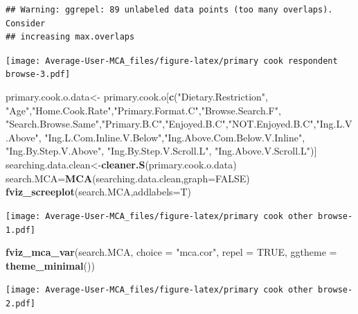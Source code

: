 \documentclass[
]{article}
\newenvironment{Shaded}{\begin{snugshade}}{\end{snugshade}}
\newcommand{\DataTypeTok}[1]{\textcolor[rgb]{0.13,0.29,0.53}{#1}}
\newcommand{\KeywordTok}[1]{\textcolor[rgb]{0.13,0.29,0.53}{\textbf{#1}}}
\newcommand{\NormalTok}[1]{#1}
\newcommand{\OtherTok}[1]{\textcolor[rgb]{0.56,0.35,0.01}{#1}}
\newcommand{\StringTok}[1]{\textcolor[rgb]{0.31,0.60,0.02}{#1}}
\begin{document}
\begin{verbatim}
## Warning: ggrepel: 89 unlabeled data points (too many overlaps). Consider
## increasing max.overlaps
\end{verbatim}

\texttt{[image: Average-User-MCA\_files/figure-latex/primary cook respondent browse-3.pdf]}

\begin{Shaded}
\begin{Highlighting}[]
\NormalTok{primary.cook.o.data<-}\StringTok{ }\NormalTok{primary.cook.o[}\KeywordTok{c}\NormalTok{(}\StringTok{"Dietary.Restriction"}\NormalTok{, }\StringTok{"Age"}\NormalTok{,}\StringTok{"Home.Cook.Rate"}\NormalTok{,}\StringTok{"Primary.Format.C"}\NormalTok{,}\StringTok{"Browse.Search.F"}\NormalTok{,}
            \StringTok{"Search.Browse.Same"}\NormalTok{,}\StringTok{"Primary.B.C"}\NormalTok{,}\StringTok{"Enjoyed.B.C"}\NormalTok{,}\StringTok{"NOT.Enjoyed.B.C"}\NormalTok{,}\StringTok{"Ing.L.V.Above"}\NormalTok{,}
            \StringTok{"Ing.L.Com.Inline.V.Below"}\NormalTok{,}\StringTok{"Ing.Above.Com.Below.V.Inline"}\NormalTok{,  }\StringTok{"Ing.By.Step.V.Above"}\NormalTok{,  }\StringTok{"Ing.By.Step.V.Scroll.L"}\NormalTok{,}
            \StringTok{"Ing.Above.V.Scroll.L"}\NormalTok{)]}
\NormalTok{searching.data.clean<-}\KeywordTok{cleaner.S}\NormalTok{(primary.cook.o.data)}
\NormalTok{search.MCA=}\KeywordTok{MCA}\NormalTok{(searching.data.clean,}\DataTypeTok{graph=}\OtherTok{FALSE}\NormalTok{)}
\KeywordTok{fviz_screeplot}\NormalTok{(search.MCA,}\DataTypeTok{addlabels=}\NormalTok{T)}
\end{Highlighting}
\end{Shaded}

\texttt{[image: Average-User-MCA\_files/figure-latex/primary cook other browse-1.pdf]}

\begin{Shaded}
\begin{Highlighting}[]
\KeywordTok{fviz_mca_var}\NormalTok{(search.MCA, }\DataTypeTok{choice =} \StringTok{"mca.cor"}\NormalTok{, }\DataTypeTok{repel =} \OtherTok{TRUE}\NormalTok{,}
             \DataTypeTok{ggtheme =} \KeywordTok{theme_minimal}\NormalTok{())}
\end{Highlighting}
\end{Shaded}

\texttt{[image: Average-User-MCA\_files/figure-latex/primary cook other browse-2.pdf]}

\begin{Shaded}
\end{Shaded}
\end{document}

